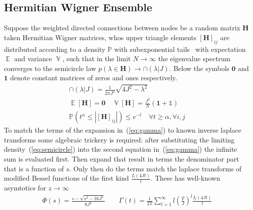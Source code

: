 \documentclass{article}[12pt]
\numberwithin{equation}{section}
\DeclareMathOperator*{\E}{\mathbb{E}}
\DeclareMathOperator*{\V}{\mathbb{V}}
\begin{document}
\subsection{Hermitian Wigner Ensemble}
Suppose the weighted directed connections between nodes be a random matrix
$\mathbf{H}$ taken Hermitian Wigner matrices, whos upper triangle elements
$[\mathbf{H}]_{ij}$ are distributed according to a density $\mathbb{P}$ with
subexponential tails~\cite{} with expectation $\E$ and variance
$\V$, such that in the limit $N\rightarrow\infty$ the eigenvalue
spectrum converges to the semicircle law $p(\lambda\in\mathbf{H})\rightarrow\cap(\lambda|J)$.
Below the symbols $\mathbf{0}$ and $\mathbf{1}$ denote constant matrices of zeros and ones
respectively.
\begin{align}
\cap(\lambda|J)=\frac{1}{2\pi J^2}\sqrt{4J^2-\lambda^2}\label{eq:semicircle}
\quad\quad\\
\E[\mathbf{H}]=\mathbf{0}
\quad
\V[\mathbf{H}]=\frac{J^2}{N}(\mathbf{1}+\mathbb{1})
\quad\\
\mathbb{P}\left(
t^\alpha\leq
\left|[\mathbf{H}]_{ij}\right|
\right)\leq e^{-t}
\quad
\forall t\geq\alpha,\forall i,j
\end{align}
To match the terms of the expansion in~(\ref{eq:gamma}) to known inverse laplace
transforms some algebraic trickery is required: after substituting the limiting
density~(\ref{eq:semicircle}) into the second equation in~(\ref{eq:gamma}) the
infinite sum is evaluated first. Then expand that result in terms the denominator
part that is a function of $s$. Only then do the terms match the laplace transforms
of modified Bessel functions of the first kind $\frac{I_{l}(4Jt)}{t}$.
These has well-known asymtotics for $z\rightarrow\infty$
\begin{align}
  \Phi(s)=\frac{s-\sqrt{s^2-16J^2}}{8J^2}\qquad
  \Gamma(t)=\frac{1}{2T}
  \sum_{l=1}^{\infty}l\left(\frac{T}{J}\right)^{l}\frac{I_{l}(4Jt)}{t}
\end{align}
\end{document}
